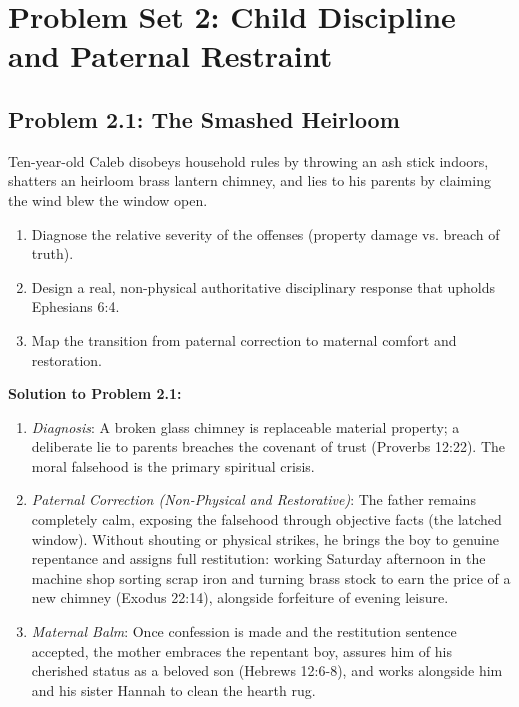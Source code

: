 \documentclass[11pt]{report}
\begin{document}
\section{Problem Set 2: Child Discipline and Paternal Restraint}

\subsection*{Problem 2.1: The Smashed Heirloom}
Ten-year-old Caleb disobeys household rules by throwing an ash stick indoors, shatters an heirloom brass lantern chimney, and lies to his parents by claiming the wind blew the window open.
\begin{enumerate}
    \item Diagnose the relative severity of the offenses (property damage vs. breach of truth).
    \item Design a real, non-physical authoritative disciplinary response that upholds Ephesians 6:4.
    \item Map the transition from paternal correction to maternal comfort and restoration.
\end{enumerate}

\begin{blackboard}
\textbf{Solution to Problem 2.1:}
\begin{enumerate}
    \item \textit{Diagnosis}: A broken glass chimney is replaceable material property; a deliberate lie to parents breaches the covenant of trust (Proverbs 12:22). The moral falsehood is the primary spiritual crisis.
    \item \textit{Paternal Correction (Non-Physical and Restorative)}: The father remains completely calm, exposing the falsehood through objective facts (the latched window). Without shouting or physical strikes, he brings the boy to genuine repentance and assigns full restitution: working Saturday afternoon in the machine shop sorting scrap iron and turning brass stock to earn the price of a new chimney (Exodus 22:14), alongside forfeiture of evening leisure.
    \item \textit{Maternal Balm}: Once confession is made and the restitution sentence accepted, the mother embraces the repentant boy, assures him of his cherished status as a beloved son (Hebrews 12:6-8), and works alongside him and his sister Hannah to clean the hearth rug.
\end{enumerate}
\end{blackboard}
\end{document}
